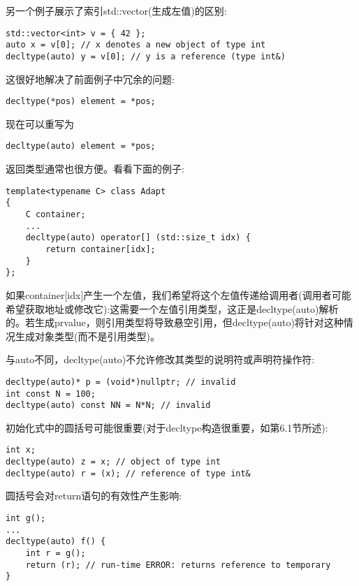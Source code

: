 另一个例子展示了索引std::vector(生成左值)的区别:

\begin{lstlisting}[style=styleCXX]
std::vector<int> v = { 42 };
auto x = v[0]; // x denotes a new object of type int
decltype(auto) y = v[0]; // y is a reference (type int&)
\end{lstlisting}

这很好地解决了前面例子中冗余的问题:

\begin{lstlisting}[style=styleCXX]
decltype(*pos) element = *pos;
\end{lstlisting}

现在可以重写为

\begin{lstlisting}[style=styleCXX]
decltype(auto) element = *pos;
\end{lstlisting}

返回类型通常也很方便。看看下面的例子:

\begin{lstlisting}[style=styleCXX]
template<typename C> class Adapt
{
	C container;
	...
	decltype(auto) operator[] (std::size_t idx) {
		return container[idx];
	}
};
\end{lstlisting}

如果container[idx]产生一个左值，我们希望将这个左值传递给调用者(调用者可能希望获取地址或修改它):这需要一个左值引用类型，这正是decltype(auto)解析的。若生成prvalue，则引用类型将导致悬空引用，但decltype(auto)将针对这种情况生成对象类型(而不是引用类型)。

与auto不同，decltype(auto)不允许修改其类型的说明符或声明符操作符:

\begin{lstlisting}[style=styleCXX]
decltype(auto)* p = (void*)nullptr; // invalid
int const N = 100;
decltype(auto) const NN = N*N; // invalid
\end{lstlisting}

初始化式中的圆括号可能很重要(对于decltype构造很重要，如第6.1节所述):

\begin{lstlisting}[style=styleCXX]
int x;
decltype(auto) z = x; // object of type int
decltype(auto) r = (x); // reference of type int&
\end{lstlisting}

圆括号会对return语句的有效性产生影响:

\begin{lstlisting}[style=styleCXX]
int g();
...
decltype(auto) f() {
	int r = g();
	return (r); // run-time ERROR: returns reference to temporary
}
\end{lstlisting}

